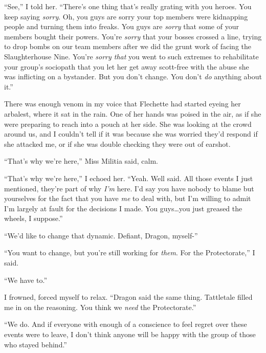 ``See,'' I told her. ``There's one thing that's really grating with you heroes.  You keep saying \emph{sorry}.  Oh, you guys are sorry your top members were kidnapping people and turning them into freaks.  You guys are \emph{sorry} that some of your members bought their powers.  You're \emph{sorry} that your bosses crossed a line, trying to drop bombs on our team members after we did the grunt work of facing the Slaughterhouse Nine.  You're \emph{sorry that }you went to such extremes to rehabilitate your group's sociopath that you let her get away scott-free with the abuse she was inflicting on a bystander.  But you don't change.  You don't \emph{do} anything about it.''



There was enough venom in my voice that Flechette had started eyeing her arbalest, where it sat in the rain.  One of her hands was poised in the air, as if she were preparing to reach into a pouch at her side.  She was looking at the crowd around us, and I couldn't tell if it was because she was worried they'd respond if she attacked me, or if she was double checking they were out of earshot.



``That's why we're here,'' Miss Militia said, calm.



``That's why we're here,'' I echoed her.  ``Yeah.  Well said.  All those events I just mentioned, they're part of why \emph{I'm} here.  I'd say you have nobody to blame but yourselves for the fact that you have \emph{me} to deal with, but I'm willing to admit I'm largely at fault for the decisions I made.  You guys\ldots you just greased the wheels, I suppose.''



``We'd like to change that dynamic.  Defiant, Dragon, myself-''



``You want to change, but you're still working for \emph{them}.  For the Protectorate,'' I said.



``We have to.''



I frowned, forced myself to relax.  ``Dragon said the same thing.  Tattletale filled me in on the reasoning.  You think we \emph{need} the Protectorate.''



``We do.  And if everyone with enough of a conscience to feel regret over these events were to leave, I don't think anyone will be happy with the group of those who stayed behind.''




